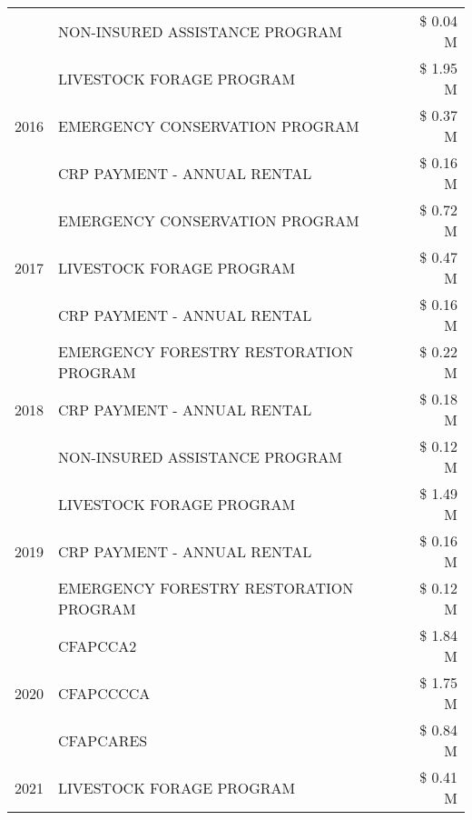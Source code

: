 \begin{tabular}{llr}
 & NON-INSURED ASSISTANCE PROGRAM & \$ 0.04 M \\
\cline{1-3}
\multirow[t]{3}{*}{2016} & LIVESTOCK FORAGE PROGRAM & \$ 1.95 M \\
 & EMERGENCY CONSERVATION PROGRAM & \$ 0.37 M \\
 & CRP PAYMENT - ANNUAL RENTAL & \$ 0.16 M \\
\cline{1-3}
\multirow[t]{3}{*}{2017} & EMERGENCY CONSERVATION PROGRAM & \$ 0.72 M \\
 & LIVESTOCK FORAGE PROGRAM & \$ 0.47 M \\
 & CRP PAYMENT - ANNUAL RENTAL & \$ 0.16 M \\
\cline{1-3}
\multirow[t]{3}{*}{2018} & EMERGENCY FORESTRY RESTORATION PROGRAM & \$ 0.22 M \\
 & CRP PAYMENT - ANNUAL RENTAL & \$ 0.18 M \\
 & NON-INSURED ASSISTANCE PROGRAM & \$ 0.12 M \\
\cline{1-3}
\multirow[t]{3}{*}{2019} & LIVESTOCK FORAGE PROGRAM & \$ 1.49 M \\
 & CRP PAYMENT - ANNUAL RENTAL & \$ 0.16 M \\
 & EMERGENCY FORESTRY RESTORATION PROGRAM & \$ 0.12 M \\
\cline{1-3}
\multirow[t]{3}{*}{2020} & CFAPCCA2 & \$ 1.84 M \\
 & CFAPCCCCA & \$ 1.75 M \\
 & CFAPCARES & \$ 0.84 M \\
\cline{1-3}
2021 & LIVESTOCK FORAGE PROGRAM & \$ 0.41 M \\
\cline{1-3}
\bottomrule
\end{tabular}
